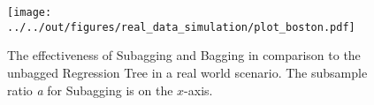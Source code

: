 \begin{figure}[t]
\centering
\texttt{[image: ../../out/figures/real\_data\_simulation/plot\_boston.pdf]}
\caption[The effectiveness of Subagging and Bagging in comparison to the unbagged Regression Tree. (Real Data Application)]{The effectiveness of Subagging and Bagging in comparison to the unbagged Regression Tree in a real world scenario. The subsample ratio \textit{a} for Subagging is on the $x$-axis.}
\label{fig:plt_boston}
\end{figure}
